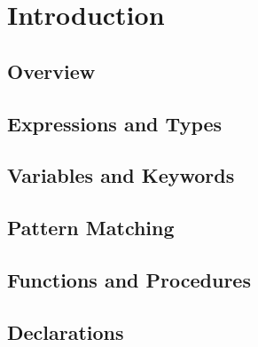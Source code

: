 \chapter{Introduction}

\section{Overview}

\section{Expressions and Types}

\section{Variables and Keywords}

\section{Pattern Matching}

\section{Functions and Procedures}

\section{Declarations}

